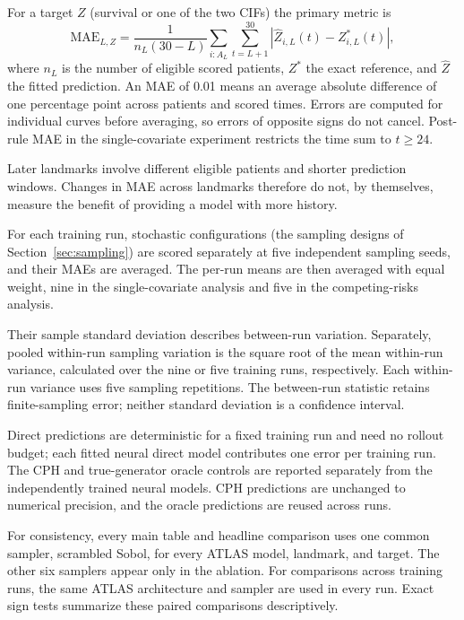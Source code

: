 For a target $Z$ (survival or one of the two CIFs) the primary metric is
\begin{equation}\label{eq:mae}
\mathrm{MAE}_{L,Z}=\frac{1}{n_L(30-L)}\sum_{i:A_L}\sum_{t=L+1}^{30}
|\widehat Z_{i,L}(t)-Z^*_{i,L}(t)|,
\end{equation}
where $n_L$ is the number of eligible scored patients, $Z^*$ the exact reference, and $\widehat Z$ the fitted prediction. An MAE of 0.01 means an average absolute difference of one percentage point across patients and scored times. Errors are computed for individual curves before averaging, so errors of opposite signs do not cancel. Post-rule MAE in the single-covariate experiment restricts the time sum to $t\ge24$.

Later landmarks involve different eligible patients and shorter prediction windows. Changes in MAE across landmarks therefore do not, by themselves, measure the benefit of providing a model with more history.

For each training run, stochastic configurations (the sampling designs of Section~\ref{sec:sampling}) are scored separately at five independent sampling seeds, and their MAEs are averaged. The per-run means are then averaged with equal weight, nine in the single-covariate analysis and five in the competing-risks analysis.

Their sample standard deviation describes between-run variation. Separately, pooled within-run sampling variation is the square root of the mean within-run variance, calculated over the nine or five training runs, respectively. Each within-run variance uses five sampling repetitions. The between-run statistic retains finite-sampling error; neither standard deviation is a confidence interval.

Direct predictions are deterministic for a fixed training run and need no rollout budget; each fitted neural direct model contributes one error per training run. The CPH and true-generator oracle controls are reported separately from the independently trained neural models. CPH predictions are unchanged to numerical precision, and the oracle predictions are reused across runs.

For consistency, every main table and headline comparison uses one common sampler, scrambled Sobol, for every ATLAS model, landmark, and target. The other six samplers appear only in the ablation. For comparisons across training runs, the same ATLAS architecture and sampler are used in every run. Exact sign tests summarize these paired comparisons descriptively.


